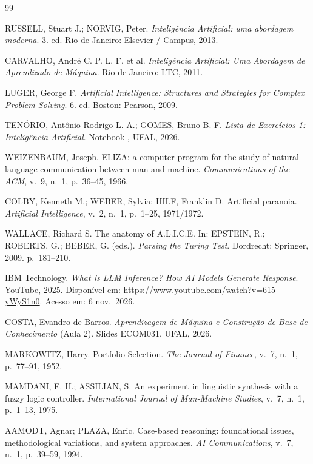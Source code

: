 \documentclass[12pt, a4paper]{article}
\DeclareRobustCommand{\texttt}[1]{\breakabletexttt{#1}}
\begin{document}
\newpage
\begin{thebibliography}{99}

RUSSELL, Stuart J.; NORVIG, Peter. \textit{Inteligência Artificial: uma abordagem moderna}. 3. ed. Rio de Janeiro: Elsevier / Campus, 2013.

CARVALHO, André C. P. L. F. et al. \textit{Inteligência Artificial: Uma Abordagem de Aprendizado de Máquina}. Rio de Janeiro: LTC, 2011.

LUGER, George F. \textit{Artificial Intelligence: Structures and Strategies for Complex Problem Solving}. 6. ed. Boston: Pearson, 2009.

TENÓRIO, Antônio Rodrigo L. A.; GOMES, Bruno B. F. \textit{Lista de Exercícios 1: Inteligência Artificial}. Notebook \texttt{Lista\_IA.ipynb}, UFAL, 2026.

WEIZENBAUM, Joseph. ELIZA: a computer program for the study of natural language communication between man and machine. \textit{Communications of the ACM}, v.~9, n.~1, p.~36--45, 1966.

COLBY, Kenneth M.; WEBER, Sylvia; HILF, Franklin D. Artificial paranoia. \textit{Artificial Intelligence}, v.~2, n.~1, p.~1--25, 1971/1972.

WALLACE, Richard S. The anatomy of A.L.I.C.E. In: EPSTEIN, R.; ROBERTS, G.; BEBER, G. (eds.). \textit{Parsing the Turing Test}. Dordrecht: Springer, 2009. p.~181--210.

IBM Technology. \textit{What is LLM Inference? How AI Models Generate Response}. YouTube, 2025. Disponível em: \url{https://www.youtube.com/watch?v=615-yWyS1n0}. Acesso em: 6 nov.\ 2026.


COSTA, Evandro de Barros. \textit{Aprendizagem de Máquina e Construção de Base de Conhecimento} (Aula 2). Slides ECOM031, UFAL, 2026.

MARKOWITZ, Harry. Portfolio Selection. \textit{The Journal of Finance}, v.~7, n.~1, p.~77--91, 1952.

MAMDANI, E. H.; ASSILIAN, S. An experiment in linguistic synthesis with a fuzzy logic controller. \textit{International Journal of Man-Machine Studies}, v.~7, n.~1, p.~1--13, 1975.

AAMODT, Agnar; PLAZA, Enric. Case-based reasoning: foundational issues, methodological variations, and system approaches. \textit{AI Communications}, v.~7, n.~1, p.~39--59, 1994.


\end{thebibliography}
\end{document}
